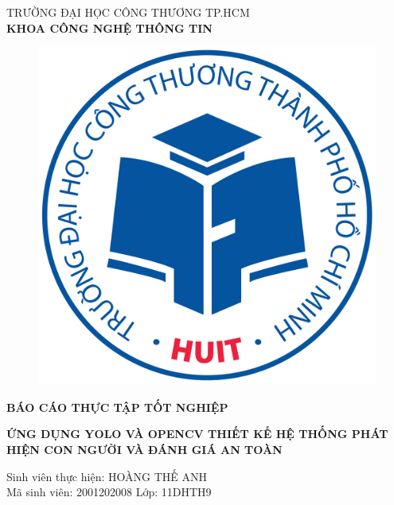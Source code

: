 \begin{center}
	\fontsize{16}{20}\selectfont
	\textsc{TRƯỜNG ĐẠI HỌC CÔNG THƯƠNG TP.HCM\\ 
		\textbf{KHOA CÔNG NGHỆ THÔNG TIN}}
	
	\vspace{0.8cm}
	\begin{figure}[htp]
		\begin{center}
			\includegraphics[scale=0.08]{logo.png}
		\end{center}
	\end{figure}
	\vspace{1cm}
	\fontsize{20}{20}\selectfont\textbf{BÁO CÁO THỰC TẬP TỐT NGHIỆP\\}
	
	\vspace{3cm}
	\fontsize{24}{20}\selectfont\textbf{ỨNG DỤNG YOLO VÀ OPENCV THIẾT KẾ HỆ THỐNG PHÁT HIỆN CON NGƯỜI VÀ ĐÁNH GIÁ AN TOÀN}
\end{center}
\vspace{2cm}
\begin{center}
	\fontsize{14}{20}\selectfont\textit{}{Sinh viên thực hiện: HOÀNG THẾ ANH}\\
	\fontsize{14}{20}\selectfont\textit{}{Mã sinh viên: 2001202008 Lớp: 11DHTH9}

\end{center}
\pagebreak